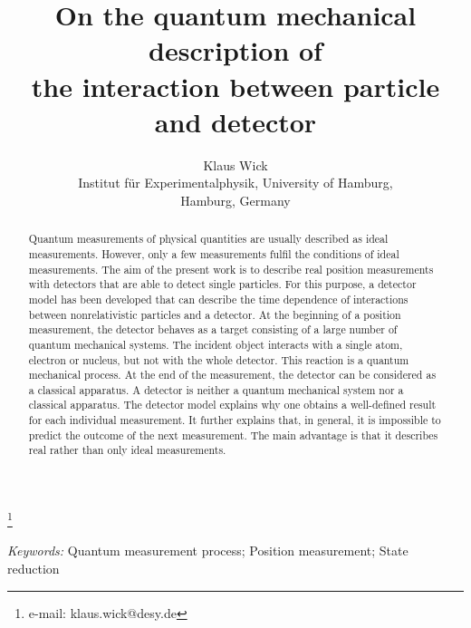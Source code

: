 \documentclass[11pt,a4paper]{article}
\begin{document}

\begin{titlepage} 
  \title{On the quantum mechanical description of \\ 
the interaction between particle and detector}
\author{Klaus Wick \\ \small{Institut f\"ur Experimentalphysik, University of Hamburg,} \\ \small{Hamburg, Germany}}
\thanks{e-mail: klaus.wick@desy.de}

\end{titlepage} 
\date{}
\maketitle

\begin{abstract}
Quantum measurements of physical quantities are usually described as ideal measurements. However, only a few measurements fulfil the conditions of ideal measurements.  The aim of the present work is to describe real position measurements with detectors that are able to detect single particles.  
For this purpose, a detector model has been developed that can describe the time dependence of interactions between nonrelativistic particles and a detector.  At the beginning of a position measurement, the detector behaves as a target consisting of a large number of quantum mechanical systems.  
The incident object interacts with a single atom, electron or nucleus, but not with the whole detector.  This reaction is a quantum mechanical process.  At the end of the measurement, the detector can be considered as a classical apparatus.  
A detector is neither a quantum mechanical system nor a classical apparatus. 
The detector model explains why one obtains a well-defined result for each individual measurement.  It further explains that, in general, it is impossible to predict the outcome of the next measurement.  
The main advantage is that it describes real rather than only ideal measurements. 
\end{abstract}

\emph{Keywords:} Quantum measurement process; Position measurement; State reduction  

\end{document}
